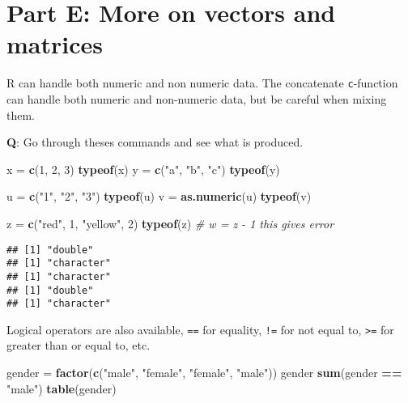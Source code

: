 \documentclass[]{article}
\newenvironment{Shaded}{\begin{snugshade}}{\end{snugshade}}
\newcommand{\KeywordTok}[1]{\textcolor[rgb]{0.13,0.29,0.53}{\textbf{#1}}}
\newcommand{\DecValTok}[1]{\textcolor[rgb]{0.00,0.00,0.81}{#1}}
\newcommand{\StringTok}[1]{\textcolor[rgb]{0.31,0.60,0.02}{#1}}
\newcommand{\CommentTok}[1]{\textcolor[rgb]{0.56,0.35,0.01}{\textit{#1}}}
\newcommand{\OperatorTok}[1]{\textcolor[rgb]{0.81,0.36,0.00}{\textbf{#1}}}
\newcommand{\NormalTok}[1]{#1}
\begin{document}
\section{Part E: More on vectors and
matrices}\label{part-e-more-on-vectors-and-matrices}

R can handle both numeric and non numeric data. The concatenate
\texttt{c}-function can handle both numeric and non-numeric data, but be
careful when mixing them.

\textbf{Q}: Go through theses commands and see what is produced.

\begin{Shaded}
\begin{Highlighting}[]
\NormalTok{x =}\StringTok{ }\KeywordTok{c}\NormalTok{(}\DecValTok{1}\NormalTok{, }\DecValTok{2}\NormalTok{, }\DecValTok{3}\NormalTok{)}
\KeywordTok{typeof}\NormalTok{(x)}
\NormalTok{y =}\StringTok{ }\KeywordTok{c}\NormalTok{(}\StringTok{"a"}\NormalTok{, }\StringTok{"b"}\NormalTok{, }\StringTok{"c"}\NormalTok{)}
\KeywordTok{typeof}\NormalTok{(y)}

\NormalTok{u =}\StringTok{ }\KeywordTok{c}\NormalTok{(}\StringTok{"1"}\NormalTok{, }\StringTok{"2"}\NormalTok{, }\StringTok{"3"}\NormalTok{)}
\KeywordTok{typeof}\NormalTok{(u)}
\NormalTok{v =}\StringTok{ }\KeywordTok{as.numeric}\NormalTok{(u)}
\KeywordTok{typeof}\NormalTok{(v)}

\NormalTok{z =}\StringTok{ }\KeywordTok{c}\NormalTok{(}\StringTok{"red"}\NormalTok{, }\DecValTok{1}\NormalTok{, }\StringTok{"yellow"}\NormalTok{, }\DecValTok{2}\NormalTok{)}
\KeywordTok{typeof}\NormalTok{(z)}
\CommentTok{# w = z - 1 this gives error}
\end{Highlighting}
\end{Shaded}

\begin{verbatim}
## [1] "double"
## [1] "character"
## [1] "character"
## [1] "double"
## [1] "character"
\end{verbatim}

Logical operators are also available, \texttt{==} for equality,
\texttt{!=} for not equal to, \texttt{\textgreater{}=} for greater than
or equal to, etc.

\begin{Shaded}
\begin{Highlighting}[]
\NormalTok{gender =}\StringTok{ }\KeywordTok{factor}\NormalTok{(}\KeywordTok{c}\NormalTok{(}\StringTok{"male"}\NormalTok{, }\StringTok{"female"}\NormalTok{, }\StringTok{"female"}\NormalTok{, }\StringTok{"male"}\NormalTok{))}
\NormalTok{gender}
\KeywordTok{sum}\NormalTok{(gender }\OperatorTok{==}\StringTok{ "male"}\NormalTok{)}
\KeywordTok{table}\NormalTok{(gender)}
\end{Highlighting}
\end{Shaded}
\end{document}
